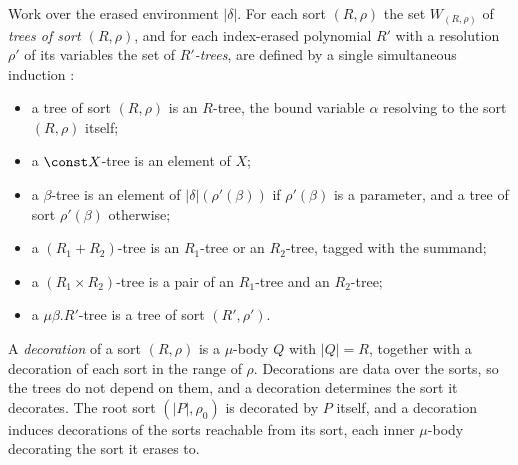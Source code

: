 \begin{definition}
\label{def:polynomial-types:trees}
Work over the erased environment $|\delta|$. For each sort $(R, \rho)$ the set $W_{(R,\rho)}$ of
\emph{trees of sort $(R, \rho)$}, and for each index-erased polynomial $R'$ with a resolution $\rho'$
of its variables the set of \emph{$R'$-trees}, are defined by a single simultaneous induction
\citep{abbott2004}:
\begin{itemize}
\item a tree of sort $(R, \rho)$ is an $R$-tree, the bound variable $\alpha$ resolving to the sort
  $(R, \rho)$ itself;
\item a $\const X$-tree is an element of $X$;
\item a $\beta$-tree is an element of $|\delta|(\rho'(\beta))$ if $\rho'(\beta)$ is a parameter, and a
  tree of sort $\rho'(\beta)$ otherwise;
\item a $(R_1 + R_2)$-tree is an $R_1$-tree or an $R_2$-tree, tagged with the summand;
\item a $(R_1 \times R_2)$-tree is a pair of an $R_1$-tree and an $R_2$-tree;
\item a $\mu\beta.R'$-tree is a tree of sort $(R', \rho')$.
\end{itemize}
\end{definition}

\begin{definition}[Decoration]
\label{def:polynomial-types:decoration}
A \emph{decoration} of a sort $(R, \rho)$ is a $\mu$-body $Q$ with $|Q| = R$, together with a
decoration of each sort in the range of $\rho$. Decorations are data over the sorts, so the trees do
not depend on them, and a decoration determines the sort it decorates. The root sort $(|P|, \rho_0)$
is decorated by $P$ itself, and a decoration induces decorations of the sorts reachable from its
sort, each inner $\mu$-body decorating the sort it erases to.
\end{definition}

